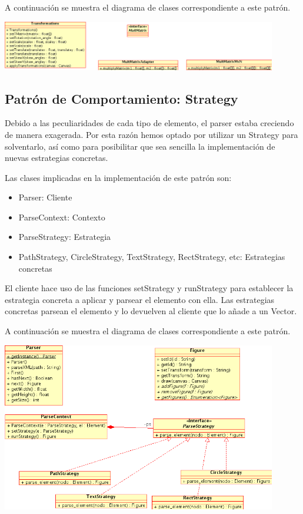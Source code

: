 \documentclass[a4paper,10pt]{article}
\begin{document}
A continuación se muestra el diagrama de clases correspondiente a este patrón.

\begin{center}
 \includegraphics[width=12cm]{adapter.png}
\end{center}

\subsection{Patrón de Comportamiento: Strategy}
Debido a las peculiaridades de cada tipo de elemento, el parser estaba creciendo de manera exagerada. Por esta razón hemos optado por utilizar un Strategy para solventarlo, así como para posibilitar que sea sencilla la implementación de nuevas estrategias concretas. 

Las clases implicadas en la implementación de este patrón son:

\begin{itemize}
\item Parser: Cliente
\item ParseContext: Contexto
\item ParseStrategy: Estrategia
\item PathStrategy, CircleStrategy, TextStrategy, RectStrategy, etc: Estrategias concretas
\end{itemize}

El cliente hace uso de las funciones setStrategy y runStrategy para establecer la estrategia concreta a aplicar y parsear el elemento con ella. Las estrategias concretas parsean el elemento y lo devuelven al cliente que lo añade a un Vector.

A continuación se muestra el diagrama de clases correspondiente a este patrón.

\begin{center}
 \includegraphics[width=12cm]{strategy.png}
\end{center}
\end{document}
